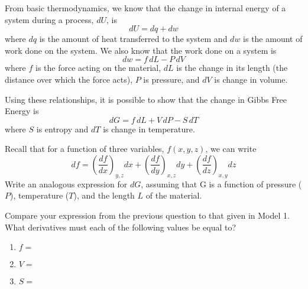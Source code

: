 \begin{activity}
\begin{instructornotes}
\end{instructornotes}


\begin{model}
\label{model:delG}

	From basic thermodynamics, we know that the change in internal energy of a system during a process, $dU$, is
	\begin{equation*}
		dU = dq + dw
	\end{equation*}
	where $dq$ is the amount of heat transferred to the system and $dw$ is the amount of work done on the system.  We also know that the work done on a system is
	\begin{equation*}
		dw = f\,dL - P\,dV
	\end{equation*}
	where $f$ is the force acting on the material, $dL$ is the change in its length (the distance over which the force acts), $P$ is pressure, and $dV$ is change in volume.
	
	Using these relationships, it is possible to show that the change in Gibbs Free Energy is
	\begin{equation*}
		dG = f\,dL + V\,dP - S\,dT
	\end{equation*}
	where $S$ is entropy and $dT$ is change in temperature.

\end{model}


\begin{ctqs}

	\question Recall that for a function of three variables, $f(x,y,z)$, we can write
		\begin{equation*}
			df = \left(\frac{df}{dx}\right)_{y,z}dx + 
				\left(\frac{df}{dy}\right)_{x,z}dy +
				\left(\frac{df}{dz}\right)_{x,y}dz
		\end{equation*}
		Write an analogous expression for $dG$, assuming that G is a function of pressure ($P$), temperature ($T$), and the length $L$ of the material.
		
		\begin{solution}[1in]
		\end{solution}
		
	\question Compare your expression from the previous question to that given in Model 1.  What derivatives must each of the following values be equal to?
	
		\begin{enumerate}
			\item $f=$
				\begin{solution}[0.5in]
				\end{solution}
			\item $V=$
				\begin{solution}[0.5in]
				\end{solution}
			\item $S=$
				\begin{solution}[0.5in]
				\end{solution}
		\end{enumerate}
		

\end{ctqs}
\end{activity}

